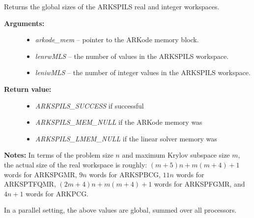 \documentclass[letterpaper,10pt,english]{sphinxmanual}
\begin{document}
\begin{fulllineitems}
\label{c_interface/User_callable:ARKSpilsGetMassWorkSpace}
Returns the global sizes of the ARKSPILS real and integer workspaces.
\begin{description}
\item[{\textbf{Arguments:}}] \leavevmode\begin{itemize}
\item {} 
\emph{arkode\_mem} -- pointer to the ARKode memory block.

\item {} 
\emph{lenrwMLS} -- the number of  values in the ARKSPILS workspace.

\item {} 
\emph{leniwMLS} -- the number of integer values in the ARKSPILS workspace.

\end{itemize}

\item[{\textbf{Return value:}}] \leavevmode\begin{itemize}
\item {} 
\emph{ARKSPILS\_SUCCESS} if successful

\item {} 
\emph{ARKSPILS\_MEM\_NULL} if the ARKode memory was 

\item {} 
\emph{ARKSPILS\_LMEM\_NULL} if the linear solver memory was 

\end{itemize}

\end{description}

\textbf{Notes:} In terms of the problem size $n$ and maximum Krylov subspace
size $m$, the actual size of the real workspace is roughly:
$(m+5)n+m(m+4)+1$  words for ARKSPGMR,
$9n$  words for ARKSPBCG, $11n$
 words for ARKSPTFQMR, $(2m+4)n+m(m+4)+1$
 words for ARKSPFGMR, and $4n+1$
 words for ARKPCG.

In a parallel setting, the above values are global, summed over all
processors.

\end{fulllineitems}

\end{document}
